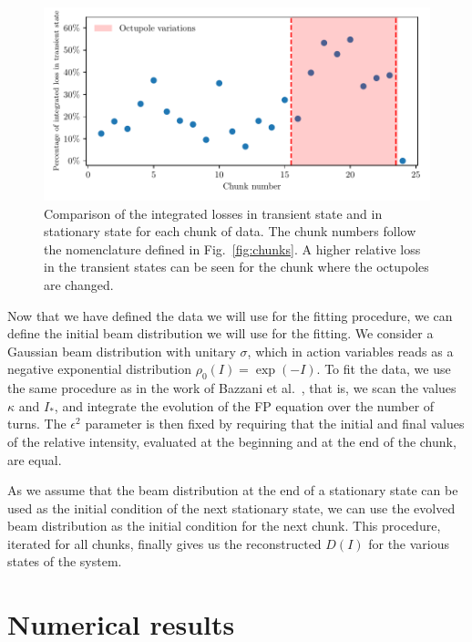 \begin{figure}[hpt]
    \centering
    \includegraphics[width=1.0\textwidth]{5_wire_compensators_LHC/figs/losses_comparison.pdf}
    \caption{Comparison of the integrated losses in transient state and in stationary state for each chunk of data. The chunk numbers follow the nomenclature defined in Fig.~\ref{fig:chunks}. A higher relative loss in the transient states can be seen for the chunk where the octupoles are changed.}
    \label{fig:wire_loss_comp}
\end{figure}

Now that we have defined the data we will use for the fitting procedure, we can define the initial beam distribution we will use for the fitting. We consider a Gaussian beam distribution with unitary $\sigma$, which in action variables reads as a negative exponential distribution $\rho_0(I) = \exp(-I)$. To fit the data, we use the same procedure as in the work of Bazzani et al.~\cite{bazzani2020diffusion}, that is, we scan the values $\kappa$ and $I_\ast$, and integrate the evolution of the FP equation over the number of turns. The $\epsilon^2$ parameter is then fixed by requiring that the initial and final values of the relative intensity, evaluated at the beginning and at the end of the chunk, are equal.

As we assume that the beam distribution at the end of a stationary state can be used as the initial condition of the next stationary state, we can use the evolved beam distribution as the initial condition for the next chunk. This procedure, iterated for all chunks, finally gives us the reconstructed $D(I)$ for the various states of the system.

\section{Numerical results}


